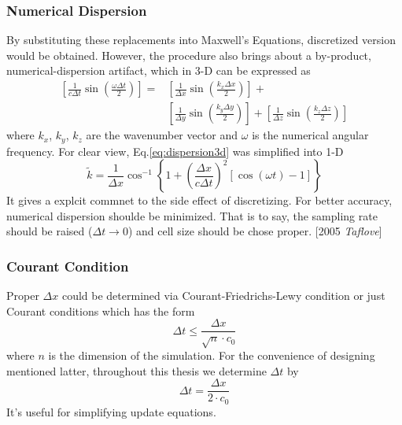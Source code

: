 \subsubsection{Numerical Dispersion}
By substituting these replacements into Maxwell's Equations, discretized version would be obtained. However, the
procedure also brings about a by-product, numerical-dispersion artifact, which in 3-D can be expressed as
\begin{equation}
  \label{eq:dispersion3d}
  \begin{split}
    \left[\frac{1}{c\Delta t}\sin\left(\frac{\omega\Delta t}{2}\right)\right] = &
    \left[\frac{1}{\Delta x}\sin\left(\frac{k_x\Delta x}{2}\right)\right] + \\ &
    \left[\frac{1}{\Delta y}\sin\left(\frac{k_y\Delta y}{2}\right)\right] +
    \left[\frac{1}{\Delta z}\sin\left(\frac{k_z\Delta z}{2}\right)\right]
  \end{split}
\end{equation}
where $k_x$, $k_y$, $k_z$ are the wavenumber vector and $\omega$ is the numerical angular frequency. For clear view,
Eq.\ref{eq:dispersion3d} was simplified into 1-D
\begin{equation}
  \widetilde{k} = \frac{1}{\Delta x} \cos^{-1} \left\{1+\left(\frac{\Delta x}{c\Delta t}\right)^2\left[\cos(\omega t)-1\right]\right\}
\end{equation}
It gives a explcit commnet to the side effect of discretizing. For better accuracy, numerical dispersion shoulde be
minimized. That is to say, the sampling rate should be raised ($\Delta t \rightarrow 0$) and cell size should be chose
proper. [2005 \textit{Taflove}]
\subsubsection{Courant Condition}
Proper $\Delta x$ could be determined via Courant-Friedrichs-Lewy condition or just Courant conditions which has the
form
\begin{equation}
  \Delta t \le \frac{\Delta x}{\sqrt{n}\cdot c_0}
\end{equation}
where $n$ is the dimension of the simulation. For the convenience of designing mentioned latter, throughout this thesis we
determine $\Delta t$ by
\begin{equation}
  \Delta t = \frac{\Delta x}{2 \cdot c_0}
\end{equation}
It's useful for simplifying update equations.




